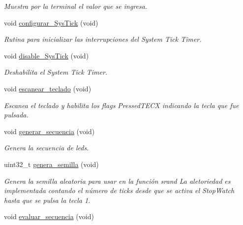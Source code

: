 \begin{DoxyCompactItemize}
\begin{DoxyCompactList}\small\item\em Muestra por la terminal el valor que se ingresa. \end{DoxyCompactList}\item 
void \hyperlink{group__operaciones_ga06774e29c33f27100818e4d6729e53f5}{configurar\+\_\+\+Sys\+Tick} (void)
\begin{DoxyCompactList}\small\item\em Rutina para inicializar las interrupciones del System Tick Timer. \end{DoxyCompactList}\item 
void \hyperlink{group__operaciones_ga239ea5221c4ea3911f206a2fdb1e51f5}{disable\+\_\+\+Sys\+Tick} (void)\hypertarget{group__operaciones_ga239ea5221c4ea3911f206a2fdb1e51f5}{}\label{group__operaciones_ga239ea5221c4ea3911f206a2fdb1e51f5}

\begin{DoxyCompactList}\small\item\em Deshabilita el System Tick Timer. \end{DoxyCompactList}\item 
void \hyperlink{group__operaciones_gabc084d731c278381710d0f1b20064dd4}{escanear\+\_\+teclado} (void)\hypertarget{group__operaciones_gabc084d731c278381710d0f1b20064dd4}{}\label{group__operaciones_gabc084d731c278381710d0f1b20064dd4}

\begin{DoxyCompactList}\small\item\em Escanea el teclado y habilita los flags Pressed\+T\+E\+CX indicando la tecla que fue pulsada. \end{DoxyCompactList}\item 
void \hyperlink{group__operaciones_ga28acc17786e880e086680ffea93268e3}{generar\+\_\+secuencia} (void)\hypertarget{group__operaciones_ga28acc17786e880e086680ffea93268e3}{}\label{group__operaciones_ga28acc17786e880e086680ffea93268e3}

\begin{DoxyCompactList}\small\item\em Genera la secuencia de leds. \end{DoxyCompactList}\item 
uint32\+\_\+t \hyperlink{group__operaciones_ga58b590058ed8f7ffde70fcf916550750}{genera\+\_\+semilla} (void)
\begin{DoxyCompactList}\small\item\em Genera la semilla aleatoria para usar en la función srand La aletoriedad es implementada contando el número de ticks desde que se activa el Stop\+Watch hasta que se pulsa la tecla 1. \end{DoxyCompactList}\item 
void \hyperlink{group__operaciones_gad8987834f99880184b40422641c9c301}{evaluar\+\_\+secuencia} (void)\hypertarget{group__operaciones_gad8987834f99880184b40422641c9c301}{}\label{group__operaciones_gad8987834f99880184b40422641c9c301}


\end{DoxyCompactItemize}

